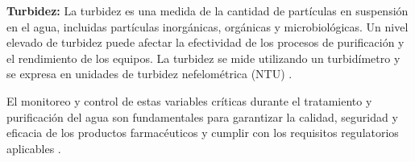 \textbf{Turbidez:} La turbidez es una medida de la cantidad de partículas en suspensión en el agua,
incluidas partículas inorgánicas, orgánicas y microbiológicas. Un nivel elevado de turbidez puede afectar
la efectividad de los procesos de purificación y el rendimiento de los equipos. La turbidez se mide utilizando
un turbidímetro y se expresa en unidades de turbidez nefelométrica (NTU) \cite{oceanebidaultQueFactoresDeterminan}.

El monitoreo y control de estas variables críticas durante el tratamiento y purificación del agua son fundamentales para garantizar la calidad, seguridad y eficacia de los productos farmacéuticos y cumplir con los requisitos regulatorios aplicables .
